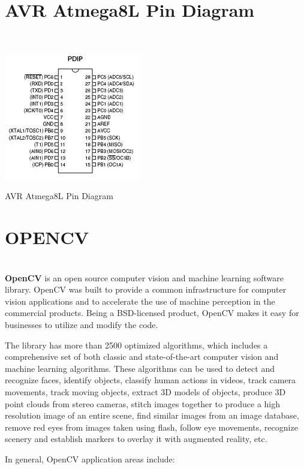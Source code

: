 \documentclass[12pt, a4paper]{article}
\begin{document}
\begin{appendices}
\section{AVR Atmega8L Pin Diagram}
~\\
\begin{appendixfig}
\centering
\includegraphics[scale=1.00]{avr.jpeg}
\caption{AVR Atmega8L Pin Diagram}
\label{}
\end{appendixfig}

\newpage
\section{OPENCV}
~\\
\textbf{\ac{OpenCV}} is an open source computer vision and machine learning software library. \ac{OpenCV} was built to provide a common infrastructure for computer vision applications and to accelerate the use of machine perception in the commercial products. Being a BSD-licensed product, \ac{OpenCV} makes it easy for businesses to utilize and modify the code.

The library has more than 2500 optimized algorithms, which includes a comprehensive set of both classic and state-of-the-art computer vision and machine learning algorithms. These algorithms can be used to detect and recognize faces, identify objects, classify human actions in videos, track camera movements, track moving objects, extract \ac{3D} models of objects, produce \ac{3D} point clouds from stereo cameras, stitch images together to produce a high resolution image of an entire scene, find similar images from an image database, remove red eyes from images taken using flash, follow eye movements, recognize scenery and establish markers to overlay it with augmented reality, etc.

In general, \ac{OpenCV} application areas include:


\end{appendices}
\end{document}
